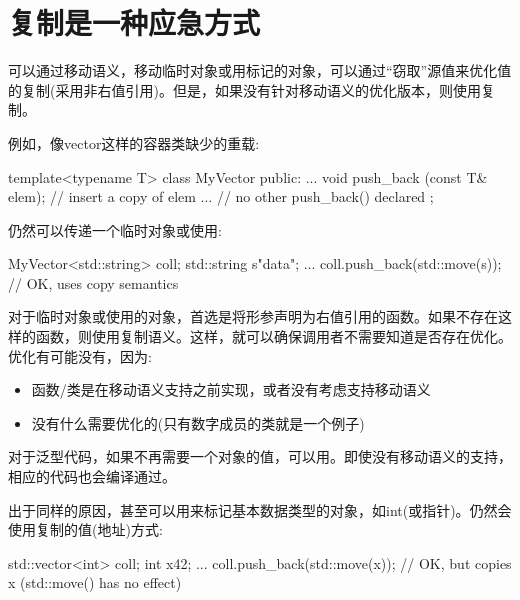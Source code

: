 \section{复制是一种应急方式}
可以通过移动语义，移动临时对象或用标记的对象，可以通过“窃取”源值来优化值的复制(采用非右值引用)。但是，如果没有针对移动语义的优化版本，则使用复制。

例如，像vector这样的容器类缺少的重载:

\begin{cppcode}
template<typename T>
class MyVector {
	public:
	...
	void push_back (const T& elem); // insert a copy of elem
	... // no other push_back() declared
};
\end{cppcode}

仍然可以传递一个临时对象或使用:

\begin{cppcode}
MyVector<std::string> coll;
std::string s{"data"};
...
coll.push_back(std::move(s)); // OK, uses copy semantics
\end{cppcode}

对于临时对象或使用的对象，首选是将形参声明为右值引用的函数。如果不存在这样的函数，则使用复制语义。这样，就可以确保调用者不需要知道是否存在优化。优化有可能没有，因为:


\begin{itemize}
	\item 函数/类是在移动语义支持之前实现，或者没有考虑支持移动语义
	\item 没有什么需要优化的(只有数字成员的类就是一个例子)
\end{itemize}

对于泛型代码，如果不再需要一个对象的值，可以用。即使没有移动语义的支持，相应的代码也会编译通过。


出于同样的原因，甚至可以用来标记基本数据类型的对象，如int(或指针)。仍然会使用复制的值(地址)方式:


\begin{cppcode}
std::vector<int> coll;
int x{42};
...
coll.push_back(std::move(x)); // OK, but copies x (std::move() has no effect)
\end{cppcode}


	